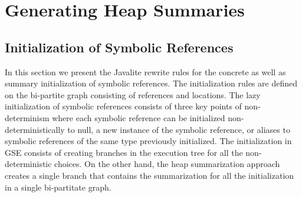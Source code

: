 \section{Generating Heap Summaries}

\subsection{Initialization of Symbolic References}

In this section we present the Javalite rewrite rules for the concrete
as well as summary initialization of symbolic references. The
initialization rules are defined on the bi-partite graph consisting of
references and locations. The lazy initialization of symbolic
references consists of three key points of non-determinism where each
symbolic reference can be initialized non-deterministically to null, a
new instance of the symbolic reference, or aliases to symbolic
references of the same type previously initialized. The initialization
in GSE consists of creating branches in the execution tree for all the
non-deterministic choices. On the other hand, the heap summarization
approach creates a single branch that contains the summarization for
all the initialization in a single bi-partitate graph.




